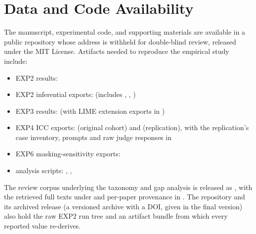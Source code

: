 \documentclass[10pt,a4paper,twoside]{article}
\newif\ifcameraready
\newcommand{\zenodoversiondoi}{\url{https://doi.org/10.5281/zenodo.23111684}}
\begin{document}
\section*{Data and Code Availability}
\label{sec:artifacts}

The manuscript, experimental code, and supporting materials are available
\ifcameraready in the public repository
\url{https://github.com/jonnabio/xai-eval-framework}\else in a public
repository whose address is withheld for double-blind review\fi, released
under the MIT License. Artifacts needed to reproduce the empirical study include:
\begin{sloppypar}
\begin{itemize}[leftmargin=*]
\item EXP2 results: 
\item EXP2 inferential exports: 
(includes ,
,
)
\item EXP3 results: 
(with LIME extension exports in )
\item EXP4 ICC exports: 
(original cohort) and  (replication),
with the replication's case inventory, prompts and raw judge responses in
\item EXP6 masking-sensitivity exports:
\item analysis scripts: ,
,
\end{itemize}
\end{sloppypar}

The review corpus underlying the taxonomy and gap analysis is released as
, with the retrieved
full texts under  and per-paper
provenance in .
The repository and its archived release\ifcameraready,
\zenodoversiondoi{},\else{} (a versioned archive with a DOI, given in the
final version)\fi{} also hold the raw EXP2 run tree and an artifact
bundle from which every reported value re-derives.
\end{document}
